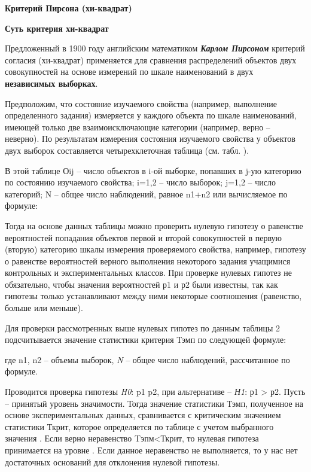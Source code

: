 \documentclass[12pt]{article}
\begin{document}
\medskip
\textbf{Критерий Пирсона (хи-квадрат)}

\medskip
\textbf{Суть критерия хи-квадрат}

\medskip
Предложенный в 1900 году английским математиком \textbf{\textit{Карлом Пирсоном}} критерий согласия (хи-квадрат) применяется для сравнения распределений объектов двух совокупностей на основе измерений по шкале наименований в двух \textbf{независимых выборках}.

\bigskip
Предположим, что состояние изучаемого свойства (например, выполнение определенного задания) измеряется у каждого объекта по шкале наименований, имеющей только две взаимоисключающие категории (например, верно – неверно). По результатам измерения состояния изучаемого свойства у объектов двух выборок составляется четырехклеточная таблица (см. табл. ).
 
В этой таблице Оij – число объектов в i-ой выборке, попавших в j-ую категорию по состоянию изучаемого свойства; i=1,2 – число выборок; j=1,2 – число категорий; N – общее число наблюдений, равное  n1+n2 или вычисляемое по формуле:

Тогда на основе данных таблицы  можно проверить нулевую гипотезу о равенстве вероятностей попадания объектов первой и второй совокупностей в первую (вторую) категорию шкалы измерения проверяемого свойства, например, гипотезу о равенстве вероятностей верного выполнения некоторого задания учащимися контрольных и экспериментальных классов.
При проверке нулевых гипотез не обязательно, чтобы значения вероятностей р1 и р2 были известны, так как гипотезы только устанавливают между ними некоторые соотношения (равенство, больше или меньше).

Для проверки рассмотренных выше нулевых гипотез по данным таблицы 2 подсчитывается значение статистики критерия Тэмп по следующей формуле:
                                            
где n1, n2 – объемы выборок, \textit{N} – общее число наблюдений, рассчитанное по формуле.

Проводится проверка гипотезы \textit{H0}: p1  p2, при альтернативе – \textit{Н1}: р1 > р2. Пусть  – принятый уровень значимости. Тогда значение статистики Тэмп, полученное на основе экспериментальных данных, сравнивается с критическим значением статистики Ткрит, которое определяется по таблице  с учетом выбранного значения  . Если верно неравенство Tэпм<Ткрит, то нулевая гипотеза принимается на уровне . Если данное неравенство не выполняется, то у нас нет достаточных оснований для отклонения нулевой гипотезы.
\end{document}
